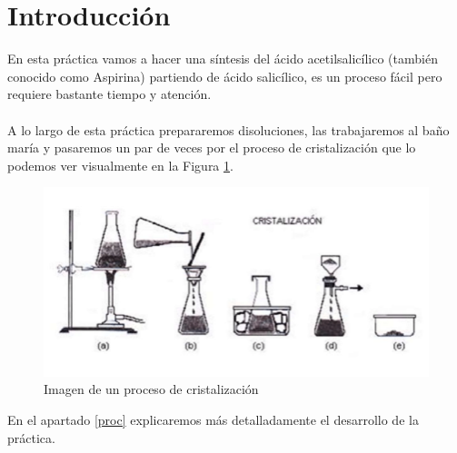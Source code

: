 \section{Introducción}
\vspace{0.2cm}
\noindent En esta práctica vamos a hacer una síntesis del ácido acetilsalicílico (también conocido como Aspirina) partiendo de ácido salicílico, es un proceso fácil pero requiere bastante tiempo y atención. \\\\
A lo largo de esta práctica prepararemos disoluciones, las trabajaremos al baño maría y pasaremos un par de veces por el proceso de cristalización que lo podemos ver visualmente en la Figura \ref{fig:cris}.

\vspace{0.4cm}

\begin{figure}[h]
    \centering
    \includegraphics[scale = 0.5]{Figura-3-Proceso-general-de-cristalizacion-por-pasos-Fuente.png}
    \caption{Imagen de un proceso de cristalización}
    \label{fig:cris}
\end{figure}

\vspace{0.6cm}

\noindent En el apartado \ref{proc} explicaremos más detalladamente el desarrollo de la práctica.

\clearpage
